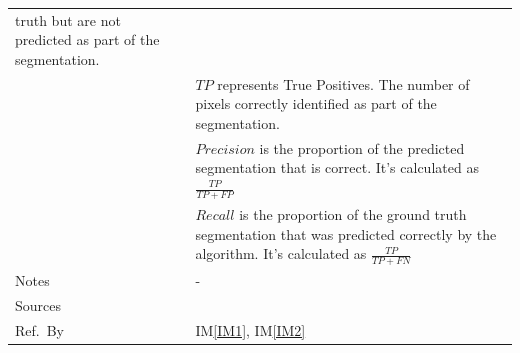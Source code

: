 \documentclass[12pt]{article}
\newcommand{\colAwidth}{0.13\textwidth}
\newcommand{\colBwidth}{0.82\textwidth}
\newcommand{\iref}[1]{IM\ref{#1}}
\begin{document}
\begin{minipage}{\textwidth}
\begin{tabular}{| p{\colAwidth} | p{\colBwidth}|}
    truth but are not predicted as part of the segmentation.                                                                                              \\
             & $TP$ represents True Positives. The number of pixels correctly identified as part of the segmentation.                                     \\
             & $Precision$ is the proportion of the predicted segmentation that is correct. It's calculated as
    $\frac{TP}{TP + FP }$                                                                                                                                 \\
             & $Recall$ is the proportion of the ground truth segmentation that was predicted correctly by the algorithm.
    It's calculated as $\frac{TP}{TP + FN }$                                                                                                              \\
    \hline
    Notes    & -                                                                                                                                          \\
    \hline
    Sources  & \cite{fedorov2017end}                                                                                                                      \\
    \hline
    Ref.\ By & \iref{IM1}, \iref{IM2}                                                                                                                     \\
    \hline
  \end{tabular}
\end{minipage}\\
\end{document}
